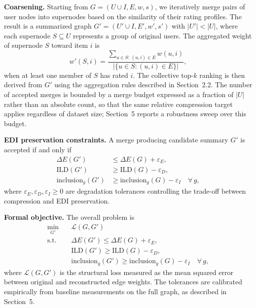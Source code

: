 \documentclass[a4paper,fleqn]{cas-dc}
\begin{document}
\smallskip\noindent\textbf{Coarsening.}
Starting from $G = (U \cup I, E, w, s)$, we iteratively merge pairs of user
nodes into supernodes based on the similarity of their rating profiles. The
result is a summarized graph $G' = (U' \cup I, E', w', s')$ with $|U'| < |U|$,
where each supernode $S \subseteq U$ represents a group of original users.
The aggregated weight of supernode $S$ toward item $i$ is
\begin{equation}
  w'(S, i) =
    \frac{\displaystyle\sum_{u \in S:\,(u,i)\in E} w(u,i)}
         {|\{u \in S : (u,i) \in E\}|},
\end{equation}
when at least one member of $S$ has rated $i$. The collective top-$k$ ranking
is then derived from $G'$ using the aggregation rules described in Section~2.2.
The number of accepted merges is bounded by a merge budget expressed as a
fraction of $|U|$ rather than an absolute count, so that the same relative
compression target applies regardless of dataset size; Section~5 reports a
robustness sweep over this budget.

\smallskip\noindent\textbf{EDI preservation constraints.}
A merge producing candidate summary $G'$ is accepted if and only if
\begin{align}
  \Delta E(G') &\leq \Delta E(G) + \varepsilon_E, \\
  \mathrm{ILD}(G') &\geq \mathrm{ILD}(G) - \varepsilon_D, \\
  \mathrm{inclusion}_g(G') &\geq \mathrm{inclusion}_g(G) - \varepsilon_I
  \quad \forall\, g,
\end{align}
where $\varepsilon_E, \varepsilon_D, \varepsilon_I \geq 0$ are degradation
tolerances controlling the trade-off between compression and EDI preservation.

\smallskip\noindent\textbf{Formal objective.}
The overall problem is
\begin{equation}
\begin{aligned}
  \min_{G'} \quad & \mathcal{L}(G, G') \\
  \text{s.t.} \quad
    & \Delta E(G') \leq \Delta E(G) + \varepsilon_E, \\
    & \mathrm{ILD}(G') \geq \mathrm{ILD}(G) - \varepsilon_D, \\
    & \mathrm{inclusion}_g(G') \geq \mathrm{inclusion}_g(G) - \varepsilon_I
      \quad \forall\, g,
\end{aligned}
\end{equation}
where $\mathcal{L}(G, G')$ is the structural loss measured as the mean squared
error between original and reconstructed edge weights. The tolerances are
calibrated empirically from baseline measurements on the full graph, as
described in Section~5.
\end{document}
